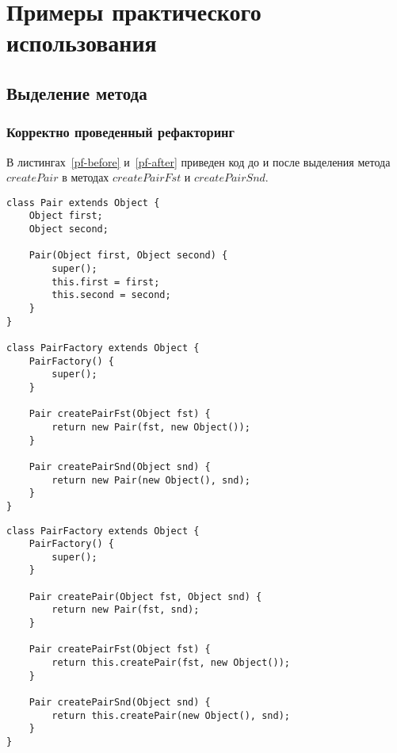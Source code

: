 \chapter{Примеры практического использования}
\section{Выделение метода}
\subsection{Корректно проведенный рефакторинг}
В листингах~\ref{pf-before} и~\ref{pf-after} приведен код до и после выделения метода $createPair$
в методах $createPairFst$ и $createPairSnd$.
\begin{lstlisting}[float,label=pf-before,caption=Код до выделения метода.]
class Pair extends Object {
    Object first;
    Object second;

    Pair(Object first, Object second) {
        super();
        this.first = first;
        this.second = second;
    }
}

class PairFactory extends Object {
    PairFactory() {
        super();
    }

    Pair createPairFst(Object fst) {
        return new Pair(fst, new Object());
    }

    Pair createPairSnd(Object snd) {
        return new Pair(new Object(), snd);
    }
}
\end{lstlisting}
\begin{lstlisting}[float,label=pf-after,caption=Код после выделения метода.]
class PairFactory extends Object {
    PairFactory() {
        super();
    }

    Pair createPair(Object fst, Object snd) {
    	return new Pair(fst, snd);
    }

    Pair createPairFst(Object fst) {
        return this.createPair(fst, new Object());
    }

    Pair createPairSnd(Object snd) {
        return this.createPair(new Object(), snd);
    }
}
\end{lstlisting}

